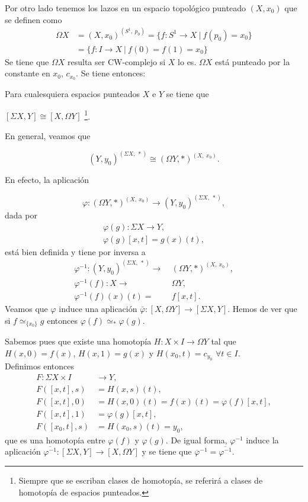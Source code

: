 Por otro lado tenemos los lazos en un espacio topológico punteado $(X, x_0)$ que se definen como
\begin{align*}
\Omega X &= (X, x_0)^{(S^1, \ p_0)} = \{ f : S^1 \longrightarrow X \ \vert \ f(p_0)  = x_0 \} \\ 
&= \{ f : I \longrightarrow X \ \vert \ f(0) = f(1) = x_0 \}
\end{align*}
Se tiene que $\Omega X$ resulta ser CW-complejo si $X$ lo es. $\Omega X$ está punteado por la constante en $x_0$, $c_{x_0}$. Se tiene entonces: 
\newpage
\begin{teor}
Para cualesquiera espacios punteados $X$ e  $Y$ se tiene que 
\begin{center}
$[\Sigma X, Y ] \cong [X, \Omega Y]$ \footnote{Siempre que se escriban clases de homotopía, se referirá a clases de homotopía de espacios punteados.}.
\end{center}
\end{teor}
\begin{demo}
En general, veamos que

\[ (Y, y_0)^{(\Sigma X, \ \ast)} \cong (\Omega Y, \ast)^{(X, \ x_0)}. \]

En efecto, la aplicación

\[ \varphi : (\Omega Y, \ast)^{(X, \ x_0)} \longrightarrow (Y, y_0)^{(\Sigma X, \ \ast)}, \]
dada por 
\begin{align*}
\varphi (g) : \Sigma X \longrightarrow Y, \\
\varphi (g)[x, t] = g(x)(t),
\end{align*} 
está bien definida y tiene por inversa a 
\begin{align*}
\varphi^{-1} :  (Y,  y_0)^{(\Sigma X, \ \ast)} \longrightarrow & \ (\Omega Y, \ast)^{(X, \ x_0)},\\
\varphi^{-1} (f) : X \longrightarrow & \ \Omega Y, \\
\varphi^{-1}(f)(x)(t) = & \ f[x, t].
\end{align*}
Veamos que $\varphi$ induce una aplicación $\bar{\varphi} : [X, \Omega Y] \longrightarrow [\Sigma X, Y] $. Hemos de ver que si $f \simeq_{\{ x_0 \}} g$ entonces $\varphi (f) \simeq_{\ast} \varphi (g)$. \par
Sabemos pues que existe una homotopía $H: X \times I \longrightarrow \Omega Y$ tal que $H(x,0) = f(x) $, $H(x,1) = g(x)$ y 
$H(x_0, t) = c_{y_0}$ $\forall t \in I$.\\
Definimos entonces 
\begin{align*}
F: \Sigma X \times I &\longrightarrow Y, \\
F([x,t],s) &= H(x,s)(t), \\
F([x,t],0) &= H(x,0)(t) = f(x)(t) = \varphi(f)[x,t], \\
F([x,t], 1) &= \varphi(g)[x,t], \\
F([x_0,t],s) &= H(x_0, s)(t) = y_0,
\end{align*}
que es una homotopía entre $\varphi (f)$ y $\varphi (g)$.
De igual forma, $\varphi^{-1}$ induce la aplicación $\overline{\varphi^{-1}} : [\Sigma X, Y] \longrightarrow [X, \Omega Y]$ y se tiene que $\overline{\varphi}^{-1} = \overline{\varphi^{-1}}$.\\
\end{demo}

